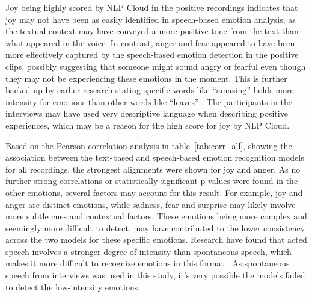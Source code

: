 Joy being highly scored by NLP Cloud in the positive recordings indicates that joy may not have been as easily identified in speech-based emotion analysis, as the textual context may have conveyed a more positive tone from the text than what appeared in the voice. In contrast, anger and fear appeared to have been more effectively captured by the speech-based emotion detection in the positive clips, possibly suggesting that someone might sound angry or fearful even though they may not be experiencing these emotions in the moment. This is further backed up by earlier research stating specific words like “amazing” holds more intensity for emotions than other words like “leaves” \autocite{Chauhan2024}. The participants in the interviews may have used very descriptive language when describing positive experiences, which may be a reason for the high score for joy by NLP Cloud.

Based on the Pearson correlation analysis in table~\ref{tab:corr_all}, showing the association between the text-based and speech-based emotion recognition models for all recordings, the strongest alignments were shown for joy and anger. As no further strong correlations or statistically significant p-values were found in the other emotions, several factors may account for this result. For example, joy and anger are distinct emotions, while sadness, fear and surprise may likely involve more subtle cues and contextual factors. These emotions being more complex and seemingly more difficult to detect, may have contributed to the lower consistency across the two models for these specific emotions. Research have found that acted speech involves a stronger degree of intensity than spontaneous speech, which makes it more difficult to recognize emotions in this format \autocite{Chakraborty2016}. As spontaneous speech from interviews was used in this study, it’s very possible the models failed to detect the low-intensity emotions.

